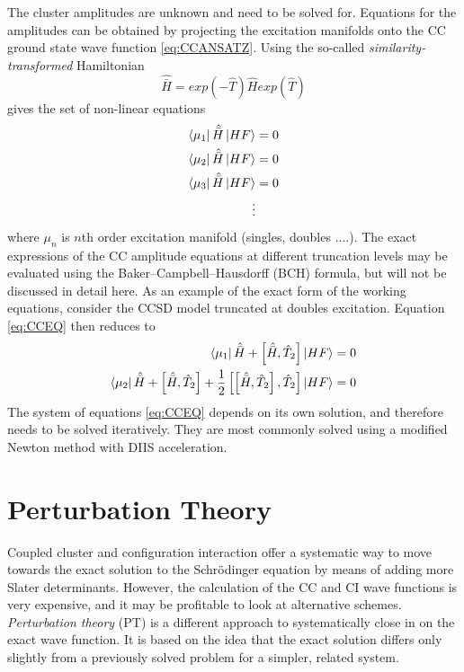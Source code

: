 The cluster amplitudes are unknown and need to be solved for. Equations for the amplitudes can be obtained by projecting the excitation manifolds onto the CC ground state wave function \ref{eq:CCANSATZ}. Using the so-called \emph{similarity-transformed} Hamiltonian
\begin{equation}
\hat{\bar{H}} = exp(-\hat{T}) \hat{H} exp(\hat{T})
\end{equation} 
\noindent gives the set of non-linear equations
\begin{align}
\begin{split}
\bra{\mu_1}\hat{\bar{H}}\ket{HF} &= 0 \\
\bra{\mu_2}\hat{\bar{H}}\ket{HF} &= 0 \\
\bra{\mu_3}\hat{\bar{H}}\ket{HF} &= 0 \\
\vdots & 
\end{split} 
\label{eq:CCEQ}
\end{align}
\noindent where $\mu_n$ is $n$th order excitation manifold (singles, doubles ....). The exact expressions of the CC amplitude equations at different truncation levels may be evaluated using the 
Baker–Campbell–Hausdorff (BCH) formula, but will not be discussed in detail here. As an example of the exact form of the working equations, consider the CCSD model truncated at doubles excitation. Equation \ref{eq:CCEQ} then reduces to
\begin{align}
\bra{\smash{\mu_1}} \hat{\bar{H}} + \left[\hat{\bar{H}},\hat{T}_2\right] \ket{\smash{HF}} = 0 
\label{eq:CCSDEQSINGLES}
\\
\bra{\smash{\mu_2}} \hat{\bar{H}} + \left[\hat{\bar{H}},\hat{T}_2\right] + \frac{1}{2} \left[ \left[ \hat{\bar{H}},\hat{T}_2\right],\hat{T}_2\right] \ket{\smash{HF}} = 0
\label{eq:CCSDEQDOUBLES}
\end{align}
The system of equations \ref{eq:CCEQ} depends on its own solution, and therefore needs to be solved iteratively. They are most commonly solved using a modified Newton method with DIIS acceleration. 

\section{Perturbation Theory}

Coupled cluster and configuration interaction offer a systematic way to move towards the exact solution to the Schrödinger equation by means of adding more Slater determinants. However, the calculation of the  CC and CI wave functions is very expensive, and it may be profitable to look at alternative schemes. \emph{Perturbation theory} (PT) is a different approach to systematically close in on the exact wave function. It is based on the idea that the exact solution differs only slightly from a previously solved problem for a simpler, related system.

